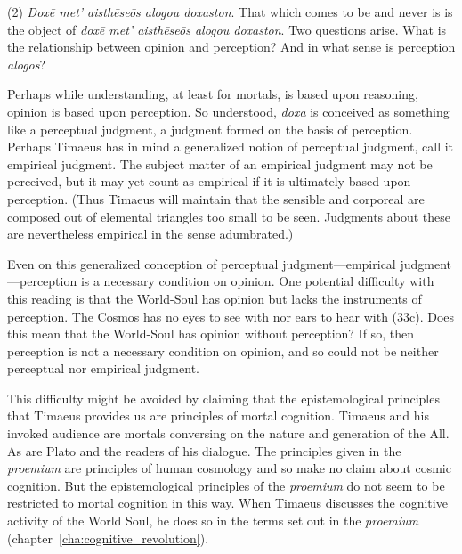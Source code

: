 (2) \emph{Doxē met' aisthēseōs alogou doxaston}. That which comes to be and never is is the object of \emph{doxē met' aisthēseōs alogou doxaston}. Two questions arise. What is the relationship between opinion and perception? And in what sense is perception \emph{alogos}? 

Perhaps while understanding, at least for mortals, is based upon reasoning, opinion is based upon perception. So understood, \emph{doxa} is conceived as something like a perceptual judgment, a judgment formed on the basis of perception. Perhaps Timaeus has in mind a generalized notion of perceptual judgment, call it empirical judgment. The subject matter of an empirical judgment may not be perceived, but it may yet count as empirical if it is ultimately based upon perception. (Thus Timaeus will maintain that the sensible and corporeal are composed out of elemental triangles too small to be seen. Judgments about these are nevertheless empirical in the sense adumbrated.)

Even on this generalized conception of perceptual judgment---empirical judgment---perception is a necessary condition on opinion. One potential difficulty with this reading is that the World-Soul has opinion but lacks the instruments of perception. The Cosmos has no eyes to see with nor ears to hear with (33c). Does this mean that the World-Soul has opinion without perception? If so, then perception is not a necessary condition on opinion, and so could not be neither perceptual nor empirical judgment. 

This difficulty might be avoided by claiming that the epistemological principles that Timaeus provides us are principles of mortal cognition. Timaeus and his invoked audience are mortals conversing on the nature and generation of the All. As are Plato and the readers of his dialogue. The principles given in the \emph{proemium} are principles of human cosmology and so make no claim about cosmic cognition. But the epistemological principles of the \emph{proemium} do not seem to be restricted to mortal cognition in this way. When Timaeus discusses the cognitive activity of the World Soul, he does so in the terms set out in the \emph{proemium} (chapter~\ref{cha:cognitive_revolution}).

